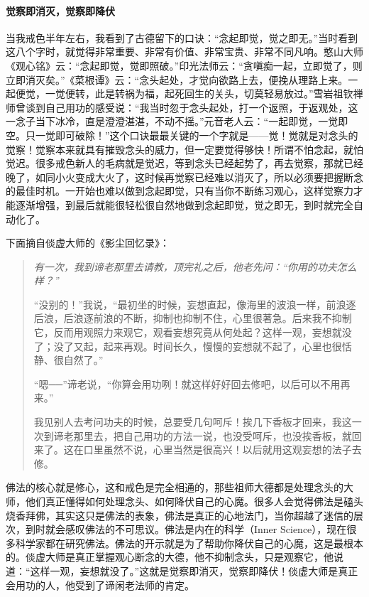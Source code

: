 \paragraph{觉察即消灭，觉察即降伏}

当我戒色半年左右，我看到了古德留下的口诀：“念起即觉，觉之即无。”当时看到这八个字时，就觉得非常重要、非常有价值、非常宝贵、非常不同凡响。憨山大师《观心铭》云：“念起即觉，觉即照破。”印光法师云：“贪嗔痴一起，立即觉了，则立即消灭矣。”《菜根谭》云：“念头起处，才觉向欲路上去，便挽从理路上来。一起便觉，一觉便转，此是转祸为福，起死回生的关头，切莫轻易放过。”雪岩祖钦禅师曾谈到自己用功的感受说：“我当时忽于念头起处，打一个返照，于返观处，这一念子当下冰冷，直是澄澄湛湛，不动不摇。”元音老人云：“一起即觉，一觉即空。只一觉即可破除！”这个口诀最最关键的一个字就是——觉！觉就是对念头的觉察！觉察本来就具有摧毁念头的威力，但一定要觉得够快！所谓不怕念起，就怕觉迟。很多戒色新人的毛病就是觉迟，等到念头已经起势了，再去觉察，那就已经晚了，如同小火变成大火了，这时候再觉察已经难以消灭了，所以必须要把握断念的最佳时机。一开始也难以做到念起即觉，只有当你不断练习观心，这样觉察力才能逐渐增强，到最后就能很轻松很自然地做到念起即觉，觉之即无，到时就完全自动化了。

下面摘自倓虚大师的《影尘回忆录》：

\begin{quotation}\it
    有一次，我到谛老那里去请教，顶完礼之后，他老先问：“你用的功夫怎么样？”

    “没别的！”我说，“最初坐的时候，妄想直起，像海里的波浪一样，前浪逐后浪，后浪逐前浪的不断，抑制也抑制不住，心里很著急。后来我不抑制它，反而用观照力来观它，观看妄想究竟从何处起？这样一观，妄想就没了；没了又起，起来再观。时间长久，慢慢的妄想就不起了，心里也很恬静、很自然了。”

    “嗯──”谛老说，“你算会用功咧！就这样好好回去修吧，以后可以不用再来。”

    我见别人去考问功夫的时候，总要受几句呵斥！挨几下香板才回来，我这一次到谛老那里去，把自己用功的方法一说，也没受呵斥，也没挨香板，就回来了。这在口里虽然不说，心里当然是很高兴！以后就用这观妄想的法子去修。
\end{quotation}

佛法的核心就是修心，这和戒色是完全相通的，那些祖师大德都是处理念头的大师，他们真正懂得如何处理念头、如何降伏自己的心魔。很多人会觉得佛法是磕头烧香拜佛，其实这只是佛法的表象，佛法是真正的心地法门，当你超越了迷信的层次，到时就会感叹佛法的不可思议。佛法是内在的科学（Inner Science），现在很多科学家都在研究佛法。佛法的开示就是为了帮助你降伏自己的心魔，这是最根本的。倓虚大师是真正掌握观心断念的大德，他不抑制念头，只是观察它，他说道：“这样一观，妄想就没了。”这就是觉察即消灭，觉察即降伏！倓虚大师是真正会用功的人，他受到了谛闲老法师的肯定。


